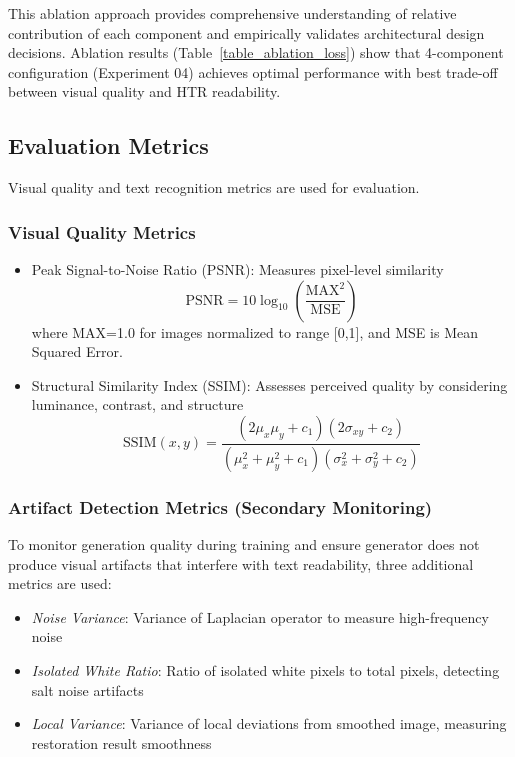 \documentclass[journal]{IEEEtran}
\begin{document}
This ablation approach provides comprehensive understanding of relative contribution of each component and empirically validates architectural design decisions. Ablation results (Table~\ref{table_ablation_loss}) show that 4-component configuration (Experiment 04) achieves optimal performance with best trade-off between visual quality and HTR readability.

\subsection{Evaluation Metrics}

Visual quality and text recognition metrics are used for evaluation.

\subsubsection{Visual Quality Metrics}

\begin{itemize}
    \item Peak Signal-to-Noise Ratio (PSNR): Measures pixel-level similarity
    \begin{equation}
    \text{PSNR} = 10 \log_{10}\left(\frac{\text{MAX}^2}{\text{MSE}}\right)
    \end{equation}
    where MAX=1.0 for images normalized to range [0,1], and MSE is Mean Squared Error.

    \item Structural Similarity Index (SSIM): Assesses perceived quality by considering luminance, contrast, and structure~\cite{wang2004ssim}
    \begin{equation}
    \text{SSIM}(x,y) = \frac{(2\mu_x\mu_y + c_1)(2\sigma_{xy} + c_2)}{(\mu_x^2 + \mu_y^2 + c_1)(\sigma_x^2 + \sigma_y^2 + c_2)}
    \end{equation}
\end{itemize}

\subsubsection{Artifact Detection Metrics (Secondary Monitoring)}

To monitor generation quality during training and ensure generator does not produce visual artifacts that interfere with text readability, three additional metrics are used:

\begin{itemize}
    \item \textit{Noise Variance}: Variance of Laplacian operator to measure high-frequency noise
    
    \item \textit{Isolated White Ratio}: Ratio of isolated white pixels to total pixels, detecting salt noise artifacts
    
    \item \textit{Local Variance}: Variance of local deviations from smoothed image, measuring restoration result smoothness
\end{itemize}
\end{document}
